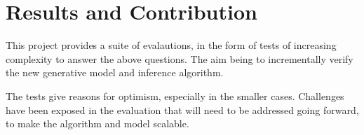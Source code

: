 \section{Results and Contribution}

This project provides a suite of evalautions, in the form of tests of increasing complexity to answer the above questions. The aim being to incrementally verify the new generative model and inference algorithm.

The tests give reasons for optimism, especially in the smaller cases. Challenges have been exposed in the evaluation that will need to be addressed going forward, to make the algorithm and model scalable.
